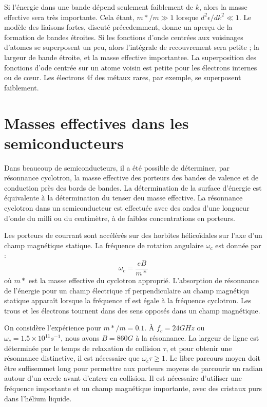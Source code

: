 Si l'énergie dans une bande dépend seulement faiblement de $k$, alors la masse
effective sera très importante. Cela étant, $m*/m \gg 1$ lorsque $d^2\epsilon /
dk^2 \ll 1$. Le modèle des liaisons fortes, discuté précedemment, donne un aperçu
de la formation de bandes étroites. Si les fonctions d'onde centrées aux
voisinages d'atomes se superposent un peu, alors l'intégrale de recouvrement sera
petite ; la largeur de bande étroite, et la masse effective importantee. La
superposition des fonctions d'ode centrée sur un atome voisin est petite pour les
électrons internes ou de cœur. Les électrons 4f des métaux rares, par exemple, se
superposent faiblement.

\section{Masses effectives dans les semiconducteurs}

Dans beaucoup de semiconducteurs, il a été possible de déterminer, par résonnance
cyclotron, la masse effective des porteurs des bandes de valence et de conduction
près des bords de bandes. La détermination de la surface d'énergie est
équivalente à la détermination du tenser deu masse effective. La résonnance
cyclotron dans un semiconducteur est effectuée avec des ondes d'une longueur
d'onde du milli ou du centimètre, à de faibles concentrations en porteurs.

Les porteurs de courrant sont accélérés sur des horbites hélicoïdales sur l'axe
d'un champ magnétique statique. La fréquence de rotation angulaire $\omega_c$ est
donnée par :
\begin{equation}
\omega_c = \frac{eB}{m*}
\end{equation}
où $m*$ est la masse effective du cyclotron approprié. L'absorption de résonnance
de l'énergie pour un champ électrique rf perpendiculaire au champ magnétiqu
statique apparaît lorsque la fréquence rf est égale à la fréquence cyclotron. Les
trous et les électrons tournent dans des sens opposés dans un champ magnétique.

On considère l'expérience pour $m*/m=0.1$. À $f_c=24GHz$ ou $\omega_c = 1.5
\times 10^{11} s^{-1}$, nous avons $ B = 860 G$ à la résonnance. La largeur de
ligne est déterminée par le temps de relaxation de collision $\tau$, et pour
obtenir une résonnance distinctive, il est nécessaire que $\omega_c \tau \geq 1$.
Le libre parcours moyen doit être suffisemmet long pour permettre aux porteurs
moyens de parcourir un radian autour d'un cercle avant d'entrer en collision. Il
est nécessaire d'utiliser une fréquence importante et un champ magnétique
importante, avec des cristaux purs dans l'hélium liquide.

